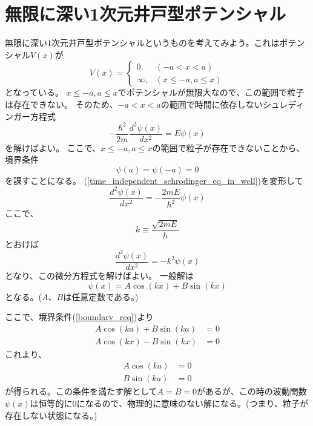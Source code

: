 
\section{無限に深い1次元井戸型ポテンシャル}
無限に深い$1$次元井戸型ポテンシャルというものを考えてみよう。これはポテンシャル$V(x)$が
\begin{equation}
	V(x) =
	\begin{cases}
		0,       & (-a < x < a) \\
		\infty , & (x \leq -a , a \leq x)
	\end{cases}
\end{equation}
となっている。
$x \leq -a , a \leq x$でポテンシャルが無限大なので、この範囲で粒子は存在できない。
そのため、$-a < x < a$の範囲で時間に依存しないシュレディンガー方程式
\begin{equation}
	\label{time_independent_schrodinger_eq_in_well}
	- \dfrac{\hbar^2}{2m} \dfrac{d^2 \psi(x)}{d x^2} = E\psi(x)
\end{equation}
を解けばよい。
ここで、$x \leq -a , a \leq x$の範囲で粒子が存在できないことから、
境界条件
\begin{equation}
	\label{boundary_req}
	\psi(a) = \psi(-a) = 0
\end{equation}
を課すことになる。
(\ref{time_independent_schrodinger_eq_in_well})を変形して
\begin{equation}
	\dfrac{d^2 \psi(x)}{d x^2} = -\dfrac{2mE}{\hbar^2}\psi(x)
\end{equation}
ここで、
\begin{equation}
	\label{k_equiv}
	k \equiv \dfrac{\sqrt{2mE}}{\hbar}
\end{equation}
とおけば
\begin{equation}
		\dfrac{d^2 \psi(x)}{d x^2} = -k^2\psi(x)
\end{equation}
となり、この微分方程式を解けばよい。
一般解は
\begin{equation}
	\psi(x) = A\cos(kx) + B\sin(kx)
\end{equation}
となる。($A$、$B$は任意定数である。)

ここで、境界条件(\ref{boundary_req})より
\begin{align}
	A\cos(ka) + B\sin(ka) &= 0 \\
	A\cos(kx) - B\sin(kx) &= 0
\end{align}
これより、
\begin{align}
	A\cos(ka) &= 0 \\
	B\sin(ka) &= 0
\end{align}
が得られる。この条件を満たす解として$A=B=0$があるが、この時の波動関数$\psi(x)$は恒等的に$0$になるので、物理的に意味のない解になる。(つまり、粒子が存在しない状態になる。)

